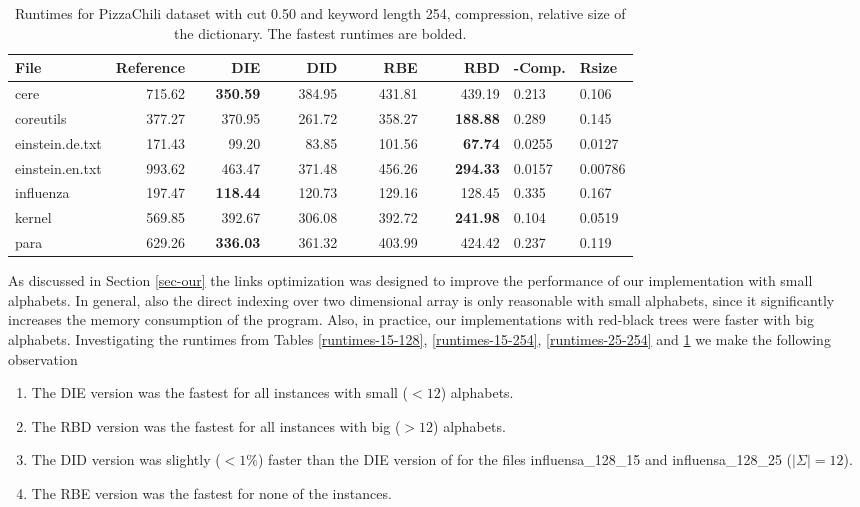 \documentclass[english,twoside,censored,csm,algorithms-track-2020]{HYthesisML}
\theoremstyle{plain}
\theoremstyle{definition}
\begin{document}
\begin{center}
  \begin{table}
  \begin{tabular} {| l |r r r r r|l l|}
    \hline
    \textbf{File} & \textbf{Reference} & ~~~~\textbf{DIE} & ~~~~\textbf{DID} & ~~~~\textbf{RBE} & ~~~~\textbf{RBD} & \textbf{-Comp.} & \textbf{Rsize} \\
    \hline
    cere & 715.62 & \textbf{350.59} & 384.95 & 431.81 & 439.19            & 0.213  & 0.106   \\
    coreutils & 377.27 & 370.95 & 261.72 & 358.27 & \textbf{188.88}       & 0.289  & 0.145   \\
    einstein.de.txt & 171.43 & 99.20 & 83.85 & 101.56 & \textbf{67.74}    & 0.0255 & 0.0127  \\
    einstein.en.txt & 993.62 & 463.47 & 371.48 & 456.26 & \textbf{294.33} & 0.0157 & 0.00786 \\
    influenza & 197.47 & \textbf{118.44} & 120.73 & 129.16 & 128.45       & 0.335  & 0.167   \\
    kernel & 569.85 & 392.67 & 306.08 & 392.72 & \textbf{241.98}          & 0.104  & 0.0519  \\
    para & 629.26 & \textbf{336.03} & 361.32 & 403.99 & 424.42            & 0.237  & 0.119   \\
    \hline
  \end{tabular}
  \caption{Runtimes for PizzaChili dataset with cut 0.50 and keyword length 254, compression, relative size of the dictionary. The fastest runtimes are bolded.}
  \label{runtimes-50-254}
  \end{table}
\end{center}

As discussed in Section \ref{sec-our} the links optimization was designed to improve the performance
of our implementation with small alphabets. In general, also the direct indexing over two
dimensional array is only reasonable with small alphabets, since it significantly increases
the memory consumption of the program. Also, in practice, our implementations with red-black trees
were faster with big alphabets. Investigating the runtimes from Tables \ref{runtimes-15-128},
\ref{runtimes-15-254}, \ref{runtimes-25-254} and \ref{runtimes-50-254} we make the following observation

\begin{enumerate}
\item The DIE version was the fastest for all instances with small ($<12$) alphabets.
\item The RBD version was the fastest for all instances with big ($>12$) alphabets.
\item The DID version was slightly ($<1\%$) faster than the DIE version of for the files influensa\_128\_15 and influensa\_128\_25 ($|\Sigma| = 12$).
\item The RBE version was the fastest for none of the instances.
\end{enumerate}
\end{document}
